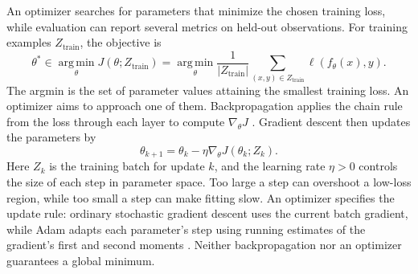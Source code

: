 \documentclass[12pt,a4paper]{article}
\numberwithin{equation}{section}
\numberwithin{table}{section}
\numberwithin{figure}{section}
\begin{document}
An optimizer searches for parameters that minimize the chosen training loss, while evaluation can report several metrics on held-out observations. For training examples $Z_{\mathrm{train}}$, the objective is
\begin{equation}\label{eq:training-objective}
\theta^*\in\operatorname*{arg\,min}_{\theta}J(\theta;Z_{\mathrm{train}})
=\operatorname*{arg\,min}_{\theta}\frac{1}{|Z_{\mathrm{train}}|}
\sum_{(x,y)\in Z_{\mathrm{train}}}\ell\!\left(f_{\theta}(x),y\right).
\end{equation}
The argmin is the set of parameter values attaining the smallest training loss. An optimizer aims to approach one of them. Backpropagation applies the chain rule from the loss through each layer to compute $\nabla_\theta J$ \cite{rumelhart1986}. Gradient descent then updates the parameters by
\begin{equation}\label{eq:gradient-descent}
\theta_{k+1}=\theta_k-\eta\nabla_\theta J(\theta_k;Z_k).
\end{equation}
Here $Z_k$ is the training batch for update $k$, and the learning rate $\eta>0$ controls the size of each step in parameter space. Too large a step can overshoot a low-loss region, while too small a step can make fitting slow. An optimizer specifies the update rule: ordinary stochastic gradient descent uses the current batch gradient, while Adam adapts each parameter's step using running estimates of the gradient's first and second moments \cite{kingma2015}. Neither backpropagation nor an optimizer guarantees a global minimum.
\end{document}
